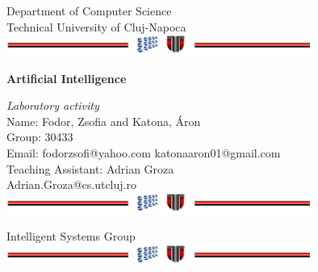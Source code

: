 \documentclass[a4paper,12pt]{report}
\begin{document}
\vspace{-5cm}
\begin{center}
Department of Computer Science\\
Technical University of Cluj-Napoca\\
\includegraphics[width=10cm]{fig/footer}
\end{center}
\vspace{1cm}
\begin{center}
\begin{Large}
 \textbf{Artificial Intelligence}\\
\end{Large}
\textit{Laboratory activity}\\
\vspace{3cm}
Name: Fodor, Zsofia and Katona, Áron\\
Group: 30433\\
Email: fodorzsofi@yahoo.com katonaaron01@gmail.com\\
\vspace{12cm}
Teaching Assistant: Adrian Groza\\
Adrian.Groza@cs.utcluj.ro\\
\vspace{1cm}
\includegraphics[width=10cm]{fig/footer}
\end{center}

\tableofcontents










\appendix

\vspace{2cm}
\begin{center}
Intelligent Systems Group\\
\includegraphics[width=10cm]{fig/footer}
\end{center}
\end{document}
